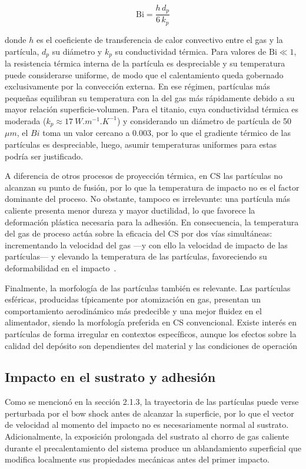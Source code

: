 \begin{equation}
\text{Bi} = \frac{h \, d_p}{6 \, k_p}
\end{equation}

\noindent donde $h$ es el coeficiente de transferencia de calor convectivo
entre el gas y la partícula, $d_p$ su diámetro y $k_p$ su conductividad
térmica. Para valores de $\text{Bi} \ll 1$, la resistencia térmica interna
de la partícula es despreciable y su temperatura puede considerarse uniforme,
de modo que el calentamiento queda gobernado exclusivamente por la convección
externa. En ese régimen, partículas más pequeñas equilibran su temperatura
con la del gas más rápidamente debido a su mayor relación superficie-volumen.
Para el titanio, cuya conductividad térmica es moderada
($k_p \approx \SI{17}{W.m^{-1}.K^{-1}}$) y considerando un diámetro de partícula de 50 $\mu m$, el $Bi$ toma un valor cercano a 0.003, por lo que el gradiente térmico de las partículas es despreciable, luego, asumir temperaturas uniformes para estas podría ser justificado.

A diferencia de otros procesos de proyección térmica, en CS las partículas
no alcanzan su punto de fusión, por lo que la temperatura de impacto no es
el factor dominante del proceso. No obstante, tampoco es irrelevante: una
partícula más caliente presenta menor dureza y mayor ductilidad, lo que
favorece la deformación plástica necesaria para la adhesión. En consecuencia,
la temperatura del gas de proceso actúa sobre la eficacia del CS por dos vías
simultáneas: incrementando la velocidad del gas —y con ello la velocidad de
impacto de las partículas— y elevando la temperatura de las partículas,
favoreciendo su deformabilidad en el impacto~\cite{Assadi2003, Moridi2014}.

Finalmente, la morfología de las partículas también es relevante. 
Las partículas esféricas, producidas típicamente por atomización en gas, 
presentan un comportamiento aerodinámico más predecible y una mejor 
fluidez en el alimentador, siendo la morfología preferida en CS 
convencional. Existe interés en partículas de forma irregular en 
contextos específicos, aunque los efectos sobre la calidad del depósito 
son dependientes del material y las condiciones de operación \cite{Wong2013}


\subsection{Impacto en el sustrato y adhesión}

Como se mencionó en la sección 2.1.3, la trayectoria de las 
partículas puede verse perturbada por el bow shock antes de alcanzar la 
superficie, por lo que el vector de velocidad al momento del impacto no es 
necesariamente normal al sustrato. Adicionalmente, la exposición prolongada 
del sustrato al chorro de gas caliente durante el precalentamiento del sistema 
produce un ablandamiento superficial que modifica localmente sus propiedades 
mecánicas antes del primer impacto.

